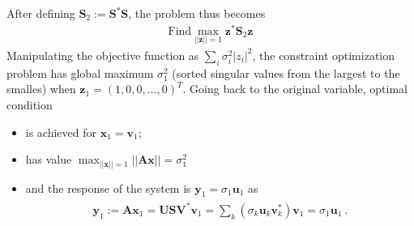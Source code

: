 \documentclass[letterpaper,10pt,english]{jupyterBook}
\begin{document}
\sphinxAtStartPar
After defining \(\mathbf{S}_2 := \mathbf{S}^* \mathbf{S}\), the problem thus becomes
\begin{equation*}
\begin{split}\text{Find} \max_{||\mathbf{z}|| = 1} \mathbf{z}^* \mathbf{S}_2 \mathbf{z}\end{split}
\end{equation*}
\sphinxAtStartPar
Manipulating the objective function as \(\sum_{i} \sigma_i^2 |z_i|^2 \), the constraint optimization problem has global maximum \(\sigma_1^2\) (sorted singular values from the largest to the smalles) when \(\mathbf{z}_1 = (1,0,0,\dots,0)^T\). Going back to the original variable, optimal condition
\begin{itemize}
\item {} 
\sphinxAtStartPar
is achieved for \(\mathbf{x}_1 = \mathbf{v}_1\);

\item {} 
\sphinxAtStartPar
has value \(\max_{||\mathbf{x}||=1}||\mathbf{A}\mathbf{x}|| = \sigma_1^2\)

\item {} 
\sphinxAtStartPar
and the response of the system is \(\mathbf{y}_1 = \sigma_1 \mathbf{u}_1\) as
\begin{equation*}
\begin{split}\begin{aligned}
    \mathbf{y}_1
    := \mathbf{A} \mathbf{x}_1 
    = \mathbf{U} \mathbf{S} \mathbf{V}^* \mathbf{v}_1 
    = \sum_{k} \left( \sigma_k \mathbf{u}_k \mathbf{v}_k^* \right) \mathbf{v}_1 
    = \sigma_1 \mathbf{u}_1 \ .
  \end{aligned}\end{split}
\end{equation*}
\end{itemize}
\label{ch/linear-algebra/svd:svd-optimization-norm}
\end{document}
